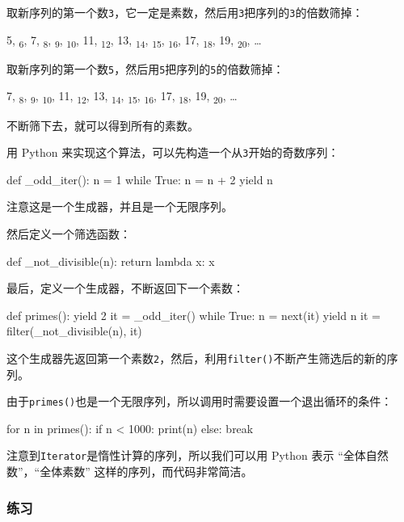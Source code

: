 取新序列的第一个数\texttt{3}，它一定是素数，然后用\texttt{3}把序列的\texttt{3}的倍数筛掉：

5, \textsubscript{6}, 7, \textsubscript{8}, \textsubscript{9},
\textsubscript{10}, 11, \textsubscript{12}, 13, \textsubscript{14},
\textsubscript{15}, \textsubscript{16}, 17, \textsubscript{18}, 19,
\textsubscript{20}, \ldots{}

取新序列的第一个数\texttt{5}，然后用\texttt{5}把序列的\texttt{5}的倍数筛掉：

7, \textsubscript{8}, \textsubscript{9}, \textsubscript{10}, 11,
\textsubscript{12}, 13, \textsubscript{14}, \textsubscript{15},
\textsubscript{16}, 17, \textsubscript{18}, 19, \textsubscript{20},
\ldots{}

不断筛下去，就可以得到所有的素数。

用 Python 来实现这个算法，可以先构造一个从\texttt{3}开始的奇数序列：

\begin{pythoncode}
def _odd_iter():
    n = 1
    while True:
        n = n + 2
        yield n
\end{pythoncode}

注意这是一个生成器，并且是一个无限序列。

然后定义一个筛选函数：

\begin{pythoncode}
def _not_divisible(n):
    return lambda x: x %
\end{pythoncode}

最后，定义一个生成器，不断返回下一个素数：

\begin{pythoncode}
def primes():
    yield 2
    it = _odd_iter() 
    while True:
        n = next(it) 
        yield n
        it = filter(_not_divisible(n), it) 
\end{pythoncode}

这个生成器先返回第一个素数\texttt{2}，然后，利用\texttt{filter()}不断产生筛选后的新的序列。

由于\texttt{primes()}也是一个无限序列，所以调用时需要设置一个退出循环的条件：

\begin{pythoncode}
for n in primes():
    if n < 1000:
        print(n)
    else:
        break
\end{pythoncode}

注意到\texttt{Iterator}是惰性计算的序列，所以我们可以用 Python 表示
``全体自然数''，``全体素数'' 这样的序列，而代码非常简洁。

\hypertarget{ux7ec3ux4e60}{%
\subsubsection{练习}\label{ux7ec3ux4e60}}

